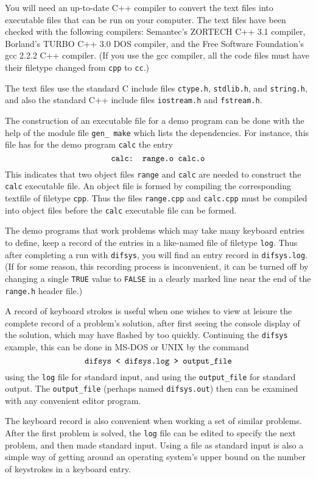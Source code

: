 You will need an up-to-date C++ compiler to convert the text files into
executable files that can be run on your computer.  The text files have been
checked with the following compilers: Semantec's ZORTECH C++ 3.1 compiler,
Borland's TURBO C++ 3.0 DOS compiler, and the Free Software Foundation's
gcc 2.2.2 C++ compiler.  (If you use the gcc compiler, all the code files
must have their filetype changed from {\tt cpp} to {\tt cc}.)

The text files use the standard C include files {\tt ctype.h},
{\tt stdlib.h}, and {\tt string.h},
and also the standard C++ include files {\tt iostream.h} and {\tt fstream.h}.

The construction of an executable file for a demo program
can be done with the help of the module file {\tt gen\_ make} which
lists the dependencies. For instance, this file has for
the demo program {\tt calc} the entry
$$\hbox{\tt calc:\ \ range.o calc.o}$$
This indicates that two object files {\tt range} and {\tt calc} are
needed to construct the {\tt calc} executable file.  An object file is
formed by  compiling the corresponding textfile of filetype {\tt cpp}. 
Thus the files {\tt range.cpp}
and {\tt calc.cpp} must be compiled into object files before the {\tt calc}
executable file can be formed.

The demo programs that work problems which may take
many keyboard entries
to define, keep a record of the entries in a like-named file of
filetype {\tt log}. Thus after completing a run with {\tt difsys},
you will find an entry record in {\tt difsys.log}.
(If for some reason, this recording process is inconvenient, it can be
turned off by changing a single {\tt TRUE} value to {\tt FALSE}
in a clearly marked line near the end of the {\tt range.h} header file.)

A record of
keyboard strokes is useful when one wishes to view at leisure
the complete record of a problem's solution, after first seeing
the console display of the solution, which may have flashed by too quickly.
Continuing the {\tt difsys} example, this can be done in MS-DOS or UNIX
by the command 
$$\hbox{\tt difsys < difsys.log > output\_file}$$
using the {\tt log}
file for standard input, and using the {\tt output\_file} for
standard output. The {\tt output\_file} (perhaps named {\tt difsys.out})
then can be examined with any convenient editor program.

The keyboard record is also convenient when 
working a set of similar problems.
After the first problem is solved, the {\tt log} file can be
edited to specify the next problem, and then made standard input.
Using a file as standard input is also a simple way of getting around
an operating system's upper bound on the number of keystrokes in
a keyboard entry.

